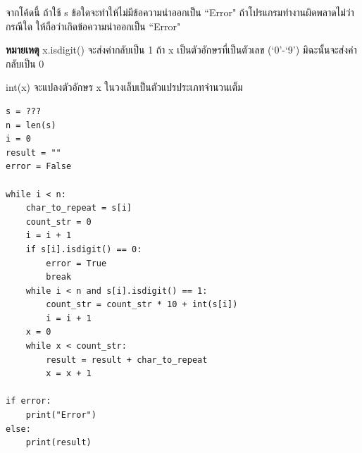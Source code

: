 \question จากโค้ดนี้ ถ้าใช้ s ข้อใดจะทำให้ไม่มีข้อความนำออกเป็น ``Error" ถ้าโปรแกรมทำงานผิดพลาดไม่ว่ากรณีใด ให้ถือว่าเกิดข้อความนำออกเป็น ``Error"

\textbf{หมายเหตุ} x.isdigit() จะส่งค่ากลับเป็น 1 ถ้า x เป็นตัวอักษรที่เป็นตัวเลข (`0'-`9') มิฉะนั้นจะส่งค่ากลับเป็น 0 

int(x) จะแปลงตัวอักษร x ในวงเล็บเป็นตัวแปรประเภทจำนวนเต็ม
\begin{verbatim}
s = ???
n = len(s)
i = 0
result = ""
error = False

while i < n:
    char_to_repeat = s[i]
    count_str = 0
    i = i + 1
    if s[i].isdigit() == 0:
        error = True
        break
    while i < n and s[i].isdigit() == 1:
        count_str = count_str * 10 + int(s[i])
        i = i + 1
    x = 0
    while x < count_str:
        result = result + char_to_repeat
        x = x + 1

if error:
    print("Error")
else:
    print(result)
\end{verbatim}
